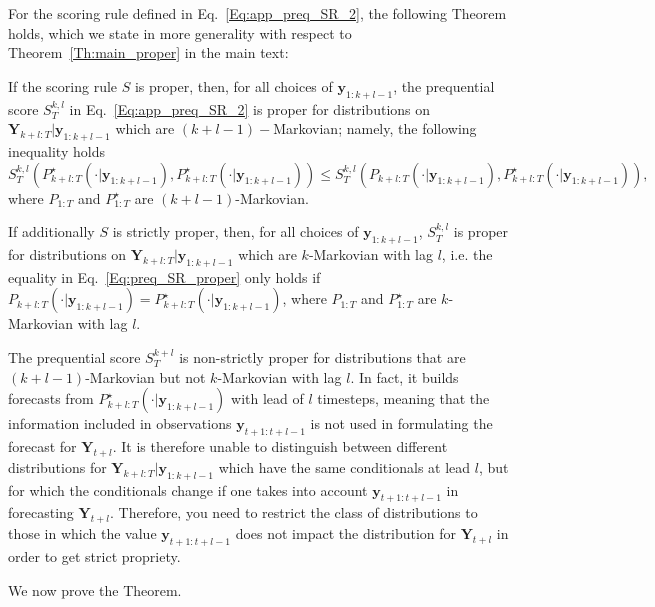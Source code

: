 \documentclass[twoside,11pt]{article}
\newcommand{\ddobs}{\mathbf{y}}
\newcommand{\Ddobs}{\mathbf{Y}}
\begin{document}
	
	
	
	
	For the scoring rule defined in Eq.~\eqref{Eq:app_preq_SR_2}, the following Theorem holds, which we state in more generality with respect to Theorem~\ref{Th:main_proper} in the main text:
	
	\begin{theorem}\label{th:proper_preq_l}
		If the scoring rule $ S $ is proper, then, for all choices of $ \ddobs_{1:k+l-1} $, the prequential score $ S_T^{k,l} $ in Eq.~\eqref{Eq:app_preq_SR_2} is proper for distributions on $ \Ddobs_{k+l:T}|\ddobs_{1:k+l-1} $ which are $ (k+l-1)- $Markovian; namely, the following inequality holds
		\begin{equation}\label{Eq:preq_SR_proper}
		S_T^{k,l}(P_{k+l:T}^\star(\cdot|\ddobs_{1:k+l-1}), P_{k+l:T}^\star(\cdot|\ddobs_{1:k+l-1}))\le 	S_T^{k,l}(P_{k+l:T}(\cdot|\ddobs_{1:k+l-1}), P_{k+l:T}^\star(\cdot|\ddobs_{1:k+l-1})),
		\end{equation}
		where $ P_{1:T} $ and $ P^\star_{1:T} $ are $ (k+l-1) $-Markovian.
		
		If additionally $ S $ is strictly proper, then, for all choices of $ \ddobs_{1:k+l-1} $, $ S_T^{k,l} $ is proper for distributions on $ \Ddobs_{k+l:T}|\ddobs_{1:k+l-1} $ which are $ k $-Markovian with lag $ l $,
		i.e. the equality in Eq.~\eqref{Eq:preq_SR_proper} only holds if $ P_{k+l:T}(\cdot|\ddobs_{1:k+l-1})=P_{k+l:T}^\star (\cdot|\ddobs_{1:k+l-1})$, where $ P_{1:T} $ and $ P^\star_{1:T} $ are $ k $-Markovian with lag $ l $.
	\end{theorem}
	
	The prequential score $ S_T^{k+l} $ is non-strictly proper for distributions that are $ (k+l-1)$-Markovian but not $ k $-Markovian with lag $ l $. In fact, it builds forecasts from $ P_{k+l:T}^\star(\cdot|\ddobs_{1:k+l-1}) $ with lead of $ l $ timesteps, meaning that the information included in observations $ \ddobs_{t+1:t+l-1} $ is not used in formulating the forecast for $ \Ddobs_{t+l} $. It is therefore unable to distinguish between different distributions for $ \Ddobs_{k+l:T}|\ddobs_{1:k+l-1} $ which have the same conditionals at lead $ l $, but for which the conditionals change if one takes into account $\ddobs_{t+1:t+l-1} $ in forecasting $ \Ddobs_{t+l} $. Therefore, you need to restrict the class of distributions to those in which the value $\ddobs_{t+1:t+l-1} $ does not impact the distribution for $ \Ddobs_{t+l} $ in order to get strict propriety. 
	
	We now prove the Theorem.
	
\end{document}
